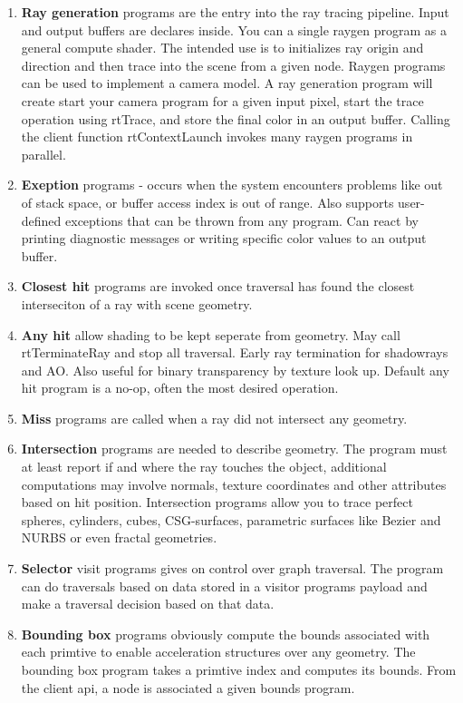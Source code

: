 \begin{enumerate}
	\item {\textbf{Ray generation} programs are the entry into the ray tracing pipeline. Input and output buffers are declares inside. You can a single raygen program as a general compute shader. The intended use is to initializes ray origin and direction and then trace into the scene from a given node. Raygen programs can be used to implement a camera model. A ray generation program will create start your camera program for a given input pixel, start the trace operation using rtTrace, and store the final color in an output buffer. Calling the client function rtContextLaunch invokes many raygen programs in parallel.}

	\item{\textbf{Exeption} programs - occurs when the system encounters problems like out of stack space, or buffer access index is out of range. Also supports user-defined exceptions that can be 	thrown from any program. Can react by printing diagnostic messages or writing specific color values to an output buffer.}

	\item{\textbf{Closest hit} programs are invoked once traversal has found the closest interseciton of a ray with scene geometry.}

	\item{\textbf{Any hit}
								allow shading to be kept seperate from geometry.
								May call rtTerminateRay and stop all traversal. Early ray termination for shadowrays and AO.
								Also useful for binary transparency by texture look up.
								Default any hit program is a no-op, often the most desired operation.}

	\item{\textbf{Miss}
								programs are called when a ray did not intersect any geometry.}



	\item {\textbf{Intersection}
								programs are needed to describe geometry. The program must at least report if and where the ray touches the object, 
								additional computations may involve normals, texture coordinates and other attributes based on hit position.
								Intersection programs allow you to trace perfect spheres, cylinders, cubes, CSG-surfaces, parametric surfaces like
								Bezier and NURBS or even fractal geometries. }
	
	\item{\textbf{Selector}
								visit programs gives on control over graph traversal.
								The program can do traversals based on data stored in a visitor programs payload and make a traversal decision based 	on that data.}

 \item{\textbf{Bounding box}
 							 programs obviously compute the bounds associated with each primtive to enable acceleration structures over any geometry.
 							 The bounding box program takes a primtive index and computes its bounds. From the client api, a node is associated a given bounds program. }
 				
\end{enumerate}
			 
